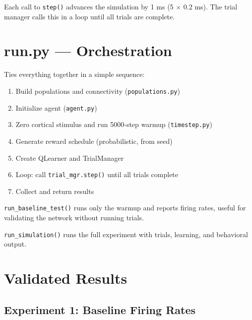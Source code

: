 \documentclass[11pt,a4paper]{article}
\begin{document}
Each call to \texttt{step()} advances the simulation by 1 ms (5 $\times$ 0.2 ms). The trial manager calls this in a loop until all trials are complete.

\newpage
\section{run.py --- Orchestration}

Ties everything together in a simple sequence:

\begin{enumerate}
    \item Build populations and connectivity (\texttt{populations.py})
    \item Initialize agent (\texttt{agent.py})
    \item Zero cortical stimulus and run 5000-step warmup (\texttt{timestep.py})
    \item Generate reward schedule (probabilistic, from seed)
    \item Create QLearner and TrialManager
    \item Loop: call \texttt{trial\_mgr.step()} until all trials complete
    \item Collect and return results
\end{enumerate}

\texttt{run\_baseline\_test()} runs only the warmup and reports firing rates, useful for validating the network without running trials.

\texttt{run\_simulation()} runs the full experiment with trials, learning, and behavioral output.

\newpage
\section{Validated Results}

\subsection{Experiment 1: Baseline Firing Rates}
\end{document}
